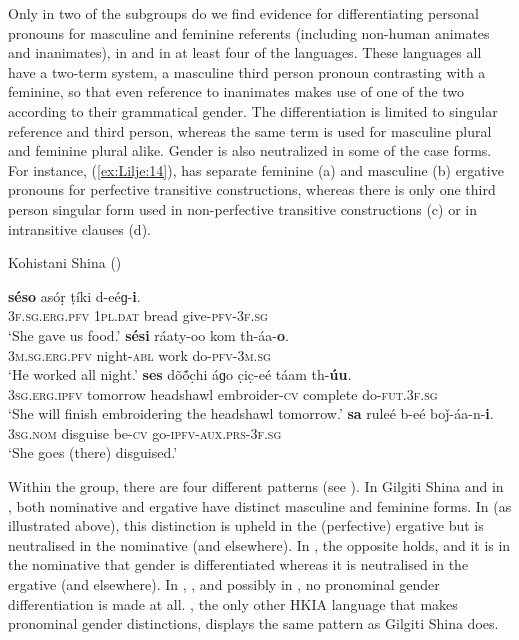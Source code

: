\documentclass[output=collectionpaper]{langsci/langscibook}
\begin{document}
Only in two of the subgroups do we find evidence for differentiating personal pronouns for masculine and feminine referents (including non-human animates and inanimates), in  and in at least four of the  languages. These languages all have a two-term system, a masculine third person pronoun contrasting with a feminine, so that even reference to inanimates makes use of one of the two according to their grammatical gender. The differentiation is limited to singular reference and third person, whereas the same term is used for masculine plural and feminine plural alike. Gender is also neutralized in some of the case forms. For instance,   (\ref{ex:Lilje:14}), has separate feminine (a) and masculine (b) ergative pronouns for perfective transitive constructions, whereas there is only one third person singular form used in non-perfective transitive constructions (c) or in intransitive clauses (d).

\ea
\label{ex:Lilje:14}
Kohistani Shina (\citealt[181, 217, 247, 224]{Schmidt2008})\\
\begin{xlist}
\ex
\gll \textbf{séso} asóṛ ṭíki d-eéɡ-\textbf{i}.    \\
\textsc{3f.sg.erg.pfv} \textsc{1pl.dat} bread give-\textsc{pfv-3f.sg}    \\
\glt `She gave us food.'
\ex
\gll \textbf{sési} ráaty-oo kom th-áa-\textbf{o}.    \\
\textsc{3m.sg.erg.pfv} night-\textsc{abl} work do-\textsc{pfv-3m.sg}    \\
\glt `He worked all night.'
\ex
\gll \textbf{ses} dõ\'{õ}c̣hi áɡo c̣ic̣-eé táam th-\textbf{úu}.  \\
\textsc{3sg.erg.ipfv} tomorrow headshawl embroider-\textsc{cv} complete do-\textsc{fut.3f.sg}  \\
\glt `She will finish embroidering the headshawl tomorrow.'
\ex
\gll \textbf{sa} ruleé b-eé boǰ-áa-n-\textbf{i}.    \\
\textsc{3sg.nom} disguise be-\textsc{cv} go-\textsc{ipfv-aux.prs-3f.sg}    \\
\glt `She goes (there) disguised.'  \\
\end{xlist}
\z

Within the  group, there are four different patterns (see ). In Gilgiti Shina and in , both nominative and ergative have distinct masculine and feminine forms. In   (as illustrated above), this distinction is upheld in the (perfective) ergative but is neutralised in the nominative (and elsewhere). In , the opposite holds, and it is in the nominative that gender is differentiated whereas it is neutralised in the ergative (and elsewhere). In , ,  and possibly in , no pronominal gender differentiation is made at all. , the only other HKIA language that makes pronominal gender distinctions, displays the same pattern as Gilgiti Shina does.
\end{document}
